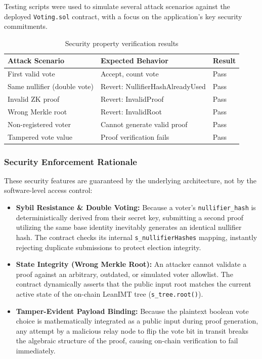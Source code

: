 \documentclass[12pt, a4paper]{report}
\begin{document}
Testing scripts were used to simulate several attack scenarios against the deployed \texttt{Voting.sol} contract, with a focus on the application's key security commitments. 

\begin{table}[H]
\centering
\caption{Security property verification results}
\label{tab:security_results}
\begin{tabular}{|l|l|l|}
\hline
\textbf{Attack Scenario} & \textbf{Expected Behavior} & \textbf{Result} \\ \hline
First valid vote & Accept, count vote & Pass \\ \hline
Same nullifier (double vote) & Revert: NullifierHashAlreadyUsed & Pass \\ \hline
Invalid ZK proof & Revert: InvalidProof & Pass \\ \hline
Wrong Merkle root & Revert: InvalidRoot & Pass \\ \hline
Non-registered voter & Cannot generate valid proof & Pass \\ \hline
Tampered vote value & Proof verification fails & Pass \\ \hline
\end{tabular}
\end{table}

\subsubsection*{Security Enforcement Rationale}
These security features are guaranteed by the underlying architecture, not by the software-level access control:
\begin{itemize}
    \item \textbf{Sybil Resistance \& Double Voting:} Because a voter's \texttt{nullifier\_hash} is deterministically derived from their secret key, submitting a second proof utilizing the same base identity inevitably generates an identical nullifier hash. The contract checks its internal \texttt{s\_nullifierHashes} mapping, instantly rejecting duplicate submissions to protect election integrity.
    \item \textbf{State Integrity (Wrong Merkle Root):} An attacker cannot validate a proof against an arbitrary, outdated, or simulated voter allowlist. The contract dynamically asserts that the public input root matches the current active state of the on-chain LeanIMT tree (\texttt{s\_tree.root()}).
    \item \textbf{Tamper-Evident Payload Binding:} Because the plaintext boolean vote choice is mathematically integrated as a public input during proof generation, any attempt by a malicious relay node to flip the vote bit in transit breaks the algebraic structure of the proof, causing on-chain verification to fail immediately.
\end{itemize}
\end{document}

